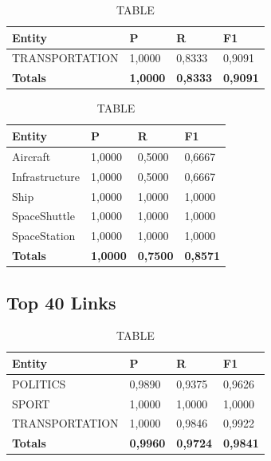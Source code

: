 \documentclass[thesis=M,english]{FITthesis}[2018/05/30]
\begin{document}
	\begin{table}[H]\centering
		\caption{TABLE}
		\label{}
		\begin{tabular}{|l|l|l|l|}
			\hline {\textbf{Entity}} & {\textbf{P}} & {\textbf{R}} & {\textbf{F1}}\\\hline
				TRANSPORTATION & 1,0000 & 0,8333 & 0,9091\\\hline
				\textbf{Totals} & \textbf{1,0000} & \textbf{0,8333} & \textbf{0,9091}\\\hline
		\end{tabular}
	\end{table}	
	
	\begin{table}[H]\centering
		\caption{TABLE}
		\label{}
		\begin{tabular}{|l|l|l|l|}
			\hline {\textbf{Entity}} & {\textbf{P}} & {\textbf{R}} & {\textbf{F1}}\\\hline
				Aircraft & 1,0000 & 0,5000 & 0,6667\\
				Infrastructure & 1,0000 & 0,5000 & 0,6667\\
				Ship & 1,0000 & 1,0000 & 1,0000\\				
				SpaceShuttle & 1,0000 & 1,0000 & 1,0000\\
				SpaceStation & 1,0000 & 1,0000 & 1,0000\\\hline
				\textbf{Totals} & \textbf{1,0000} & \textbf{0,7500} & \textbf{0,8571}\\\hline
		\end{tabular}
	\end{table}
	
	

\subsection{Top 40 Links}
	
	\begin{table}[H]\centering
		\caption{TABLE}
		\label{}
		\begin{tabular}{|l|l|l|l|}
			\hline {\textbf{Entity}} & {\textbf{P}} & {\textbf{R}} & {\textbf{F1}}\\\hline
				POLITICS & 0,9890 & 0,9375 & 0,9626\\
				SPORT & 1,0000 & 1,0000 & 1,0000\\
				TRANSPORTATION & 1,0000 & 0,9846 & 0,9922\\\hline
				\textbf{Totals} & \textbf{0,9960} & \textbf{0,9724} & \textbf{0,9841}\\\hline
		\end{tabular}
	\end{table}
\end{document}
